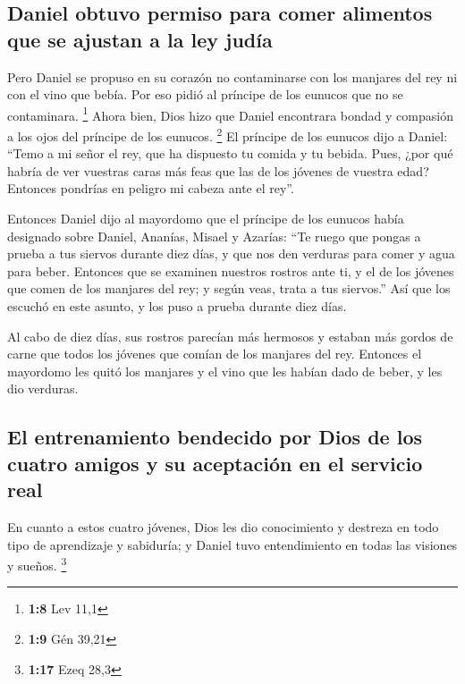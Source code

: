 \hypertarget{daniel-obtuvo-permiso-para-comer-alimentos-que-se-ajustan-a-la-ley-juduxeda}{%
\subsection{Daniel obtuvo permiso para comer alimentos que se ajustan a
la ley
judía}\label{daniel-obtuvo-permiso-para-comer-alimentos-que-se-ajustan-a-la-ley-juduxeda}}

 Pero Daniel se propuso en su corazón no contaminarse con
los manjares del rey ni con el vino que bebía. Por eso pidió al príncipe
de los eunucos que no se contaminara. \footnote{\textbf{1:8} Lev 11,1}
 Ahora bien, Dios hizo que Daniel encontrara bondad y
compasión a los ojos del príncipe de los eunucos. \footnote{\textbf{1:9}
  Gén 39,21}  El príncipe de los eunucos dijo a Daniel:
``Temo a mi señor el rey, que ha dispuesto tu comida y tu bebida. Pues,
¿por qué habría de ver vuestras caras más feas que las de los jóvenes de
vuestra edad? Entonces pondrías en peligro mi cabeza ante el rey''.

 Entonces Daniel dijo al mayordomo que el príncipe de los
eunucos había designado sobre Daniel, Ananías, Misael y Azarías:
 ``Te ruego que pongas a prueba a tus siervos durante
diez días, y que nos den verduras para comer y agua para beber.
 Entonces que se examinen nuestros rostros ante ti, y el
de los jóvenes que comen de los manjares del rey; y según veas, trata a
tus siervos.''  Así que los escuchó en este asunto, y los
puso a prueba durante diez días.

 Al cabo de diez días, sus rostros parecían más hermosos
y estaban más gordos de carne que todos los jóvenes que comían de los
manjares del rey.  Entonces el mayordomo les quitó los
manjares y el vino que les habían dado de beber, y les dio verduras.

\hypertarget{el-entrenamiento-bendecido-por-dios-de-los-cuatro-amigos-y-su-aceptaciuxf3n-en-el-servicio-real}{%
\subsection{El entrenamiento bendecido por Dios de los cuatro amigos y
su aceptación en el servicio
real}\label{el-entrenamiento-bendecido-por-dios-de-los-cuatro-amigos-y-su-aceptaciuxf3n-en-el-servicio-real}}

 En cuanto a estos cuatro jóvenes, Dios les dio
conocimiento y destreza en todo tipo de aprendizaje y sabiduría; y
Daniel tuvo entendimiento en todas las visiones y sueños. \footnote{\textbf{1:17}
  Ezeq 28,3}

